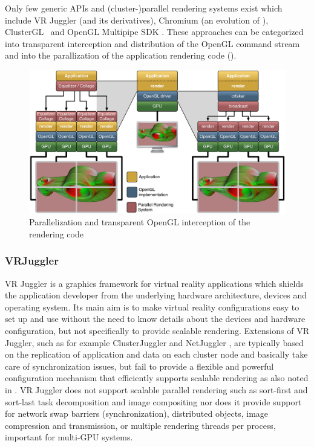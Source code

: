 Only few generic APIs and (cluster-)parallel rendering systems exist which
include VR Juggler \cite{BJHMBC:01} (and its derivatives), Chromium
\cite{HHNFAKK:02} (an evolution of \cite{Humphreys99,Humphreys00,HEBSEH:01}),
{ClusterGL}~\cite{NHM:11} and OpenGL Multipipe SDK
\cite{JDBJBCER:04,BRE:05,MPK}. These approaches can be categorized into
transparent interception and distribution of the OpenGL command stream and into
the parallization of the application rendering code ().

\begin{figure}[h!t]
 \includegraphics[width=\textwidth]{images/chromiumVsEq}
 \caption{Parallelization and transparent OpenGL interception of the rendering code\label{fChromium}}
\end{figure}

\subsubsection{VRJuggler}

VR Juggler \cite{BJHMBC:01,JBBC:98} is a graphics framework for virtual reality
applications which shields the application developer from the underlying
hardware architecture, devices and operating system. Its main aim is to make
virtual reality configurations easy to set up and use without the need to know
details about the devices and hardware configuration, but not specifically to
provide scalable rendering. Extensions of VR Juggler, such as for example
ClusterJuggler \cite{BC:03} and NetJuggler \cite{AGLMR:02}, are typically based
on the replication of application and data on each cluster node and basically
take care of synchronization issues, but fail to provide a flexible and
powerful configuration mechanism that efficiently supports scalable rendering
as also noted in \cite{SWNH:03}. VR Juggler does not support scalable parallel
rendering such as sort-first and sort-last task decomposition and image
compositing nor does it provide support for network swap barriers
(synchronization), distributed objects, image compression and transmission, or
multiple rendering threads per process, important for multi-GPU systems.

